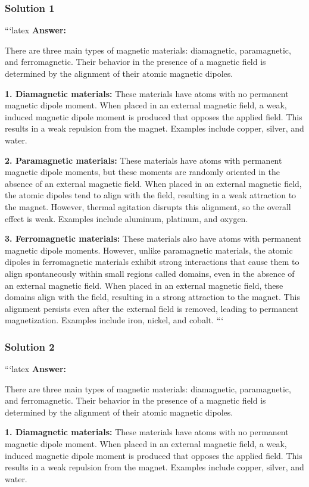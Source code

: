\documentclass{article}
\begin{document}
\subsubsection{Solution 1}
```latex
\textbf{Answer:}

There are three main types of magnetic materials: diamagnetic, paramagnetic, and ferromagnetic. Their behavior in the presence of a magnetic field is determined by the alignment of their atomic magnetic dipoles.

\textbf{1. Diamagnetic materials:} 
These materials have atoms with no permanent magnetic dipole moment. When placed in an external magnetic field, a weak, induced magnetic dipole moment is produced that opposes the applied field. This results in a weak repulsion from the magnet. Examples include copper, silver, and water.

\textbf{2. Paramagnetic materials:} 
These materials have atoms with permanent magnetic dipole moments, but these moments are randomly oriented in the absence of an external magnetic field. When placed in an external magnetic field, the atomic dipoles tend to align with the field, resulting in a weak attraction to the magnet. However, thermal agitation disrupts this alignment, so the overall effect is weak. Examples include aluminum, platinum, and oxygen.

\textbf{3. Ferromagnetic materials:} 
These materials also have atoms with permanent magnetic dipole moments. However, unlike paramagnetic materials, the atomic dipoles in ferromagnetic materials exhibit strong interactions that cause them to align spontaneously within small regions called domains, even in the absence of an external magnetic field. When placed in an external magnetic field, these domains align with the field, resulting in a strong attraction to the magnet. This alignment persists even after the external field is removed, leading to permanent magnetization. Examples include iron, nickel, and cobalt. 
```

\subsubsection{Solution 2}
```latex
\textbf{Answer:}

There are three main types of magnetic materials: diamagnetic, paramagnetic, and ferromagnetic. Their behavior in the presence of a magnetic field is determined by the alignment of their atomic magnetic dipoles.

\textbf{1. Diamagnetic materials:} 
These materials have atoms with no permanent magnetic dipole moment. When placed in an external magnetic field, a weak, induced magnetic dipole moment is produced that opposes the applied field. This results in a weak repulsion from the magnet. Examples include copper, silver, and water.
\end{document}
